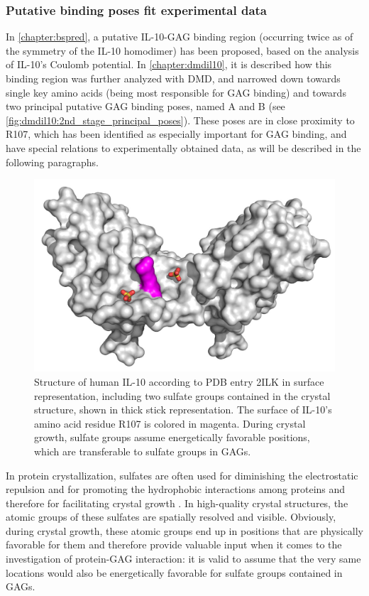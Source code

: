 \subsubsection{Putative binding poses fit experimental data}

In \cref{chapter:bspred}, a putative IL-10-GAG binding region (occurring twice
as of the symmetry of the IL-10 homodimer) has been proposed, based on the
analysis of IL-10's Coulomb potential. In \cref{chapter:dmdil10}, it is
described how this binding region was further analyzed with DMD, and narrowed
down towards single key amino acids (being most responsible for GAG binding) and
towards two principal putative GAG binding poses, named A and B (see
\cref{fig:dmdil10:2nd_stage_principal_poses}). These poses are in close
proximity to R107, which has been identified as especially important for GAG
binding, and have special relations to experimentally obtained data, as will be
described in the following paragraphs.

\begin{figure}
\centering
\includegraphics[width=1.0\textwidth]{gfx/together/il10sulfates_01.jpg}
\caption[]{
Structure of human IL-10 according to PDB entry 2ILK in surface representation,
including two sulfate groups contained in the crystal structure, shown in thick
stick representation. The surface of IL-10's amino acid residue R107 is colored
in magenta. During crystal growth, sulfate groups assume energetically favorable
positions, which are transferable to sulfate groups in GAGs.}
\label{fig:together:il10sulfates}
\end{figure}

In protein crystallization, sulfates are often used for diminishing the
electrostatic repulsion and for promoting the hydrophobic interactions among
proteins and therefore for facilitating crystal growth
\cite{crystal_salts_2001}. In high-quality crystal structures, the atomic groups
of these sulfates are spatially resolved and visible. Obviously, during crystal
growth, these atomic groups end up in positions that are physically favorable
for them and therefore provide valuable input when it comes to the investigation
of protein-GAG interaction: it is valid to assume that the very same locations
would also be energetically favorable for sulfate groups contained in GAGs.

